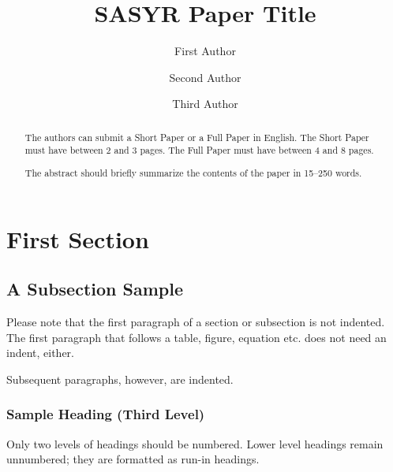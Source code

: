 \documentclass[runningheads]{llncs}
\begin{document}
%
\title{SASYR Paper Title}
%
%
\author{First Author \and
Second Author \and
Third Author}
%
%
%
\maketitle              %
%
\begin{abstract}
The authors can submit a Short Paper or a Full Paper in English.
The Short Paper must have between 2 and 3 pages.
The Full Paper must have between 4 and 8 pages.

The abstract should briefly summarize the contents of the paper in
15--250 words. 


\end{abstract}
%
%
%
\section{First Section}
\subsection{A Subsection Sample}
Please note that the first paragraph of a section or subsection is
not indented. The first paragraph that follows a table, figure,
equation etc. does not need an indent, either.

Subsequent paragraphs, however, are indented.

\subsubsection{Sample Heading (Third Level)} Only two levels of
headings should be numbered. Lower level headings remain unnumbered;
they are formatted as run-in headings.
\end{document}

